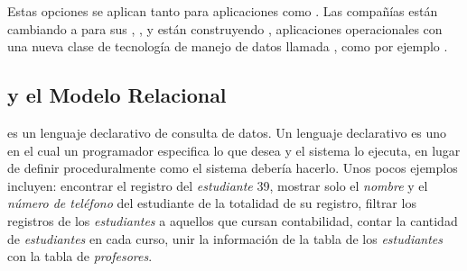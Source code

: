 Estas opciones se aplican tanto para aplicaciones \analyticProcessing como \tarnsactionalProcessing. Las compañías están cambiando \workloads a \hadoopNAME para sus \offline, \analytical \workloads, y están construyendo \online, aplicaciones operacionales con una nueva clase de tecnología de manejo de datos llamada \nosql, como por ejemplo \mongodbNAME.

\subsection{\sql y el Modelo Relacional}

\sql es un lenguaje declarativo de consulta de datos. Un lenguaje declarativo es uno en el cual un programador especifica lo que desea y el sistema lo ejecuta, en lugar de definir proceduralmente como el sistema debería hacerlo. Unos pocos ejemplos incluyen: encontrar el registro del \textit{estudiante} 39, mostrar solo el \textit{nombre} y el \textit{número de teléfono} del estudiante de la totalidad de su registro, filtrar los registros de los \textit{estudiantes} a aquellos que cursan contabilidad, contar la cantidad de \textit{estudiantes} en cada curso, unir la información de la tabla de los \textit{estudiantes} con la tabla de \textit{profesores}.


